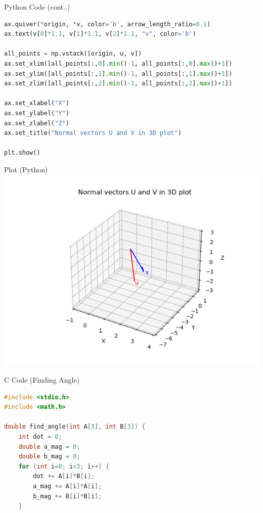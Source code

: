 \documentclass{beamer}
\begin{document}
\begin{frame}[fragile]{Python Code (cont..)}
\begin{lstlisting}[language=Python]
ax.quiver(*origin, *v, color='b', arrow_length_ratio=0.1)
ax.text(v[0]*1.1, v[1]*1.1, v[2]*1.1, "v", color='b')

all_points = np.vstack([origin, u, v])
ax.set_xlim([all_points[:,0].min()-1, all_points[:,0].max()+1])
ax.set_ylim([all_points[:,1].min()-1, all_points[:,1].max()+1])
ax.set_zlim([all_points[:,2].min()-1, all_points[:,2].max()+1])

ax.set_xlabel("X")
ax.set_ylabel("Y")
ax.set_zlabel("Z")
ax.set_title("Normal vectors U and V in 3D plot")

plt.show()
\end{lstlisting}
\end{frame}

\begin{frame}{Plot (Python)}
\centering
\includegraphics[width=1\linewidth]{figs/plt.png}
\end{frame}


\begin{frame}[fragile]{C Code (Finding Angle)}
\begin{lstlisting}[language=C]
#include <stdio.h>
#include <math.h>

double find_angle(int A[3], int B[3]) {
    int dot = 0;
    double a_mag = 0;
    double b_mag = 0;
    for (int i=0; i<3; i++) {
        dot += A[i]*B[i];
        a_mag += A[i]*A[i];
        b_mag += B[i]*B[i];
    }

\end{lstlisting}
\end{frame}
\end{document}
